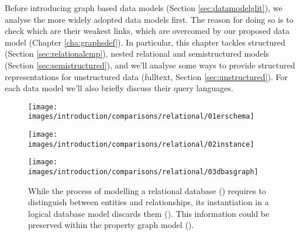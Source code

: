Before introducing graph based data models (Section \ref{sec:datamodelglit}), we  analyse the more widely adopted data models first. The reason for doing so is to check which are their weakest links, which are overcomed by our proposed data model (Chapter \vref{cha:graphsdef}). In particular, this chapter tackles structured (Section \vref{sec:relationalcmp}), nested relational and semistructured models (Section \vref{sec:semistructured}), and we'll analyse some ways to provide structured representations for unstructured data (fulltext, Section \vref{sec:unstructured}). For each data model we'll also briefly discuss their query languages.
\begin{figure}[!pth]
	\begin{minipage}[b]{\textwidth}
		\texttt{[image: images/introduction/comparisons/relational/01erschema]}
		\label{fig:erschema}
	\end{minipage}\quad

	\begin{minipage}[b]{\textwidth}
		\texttt{[image: images/introduction/comparisons/relational/02instance]}
		\label{fig:instance}
	\end{minipage}

	\begin{minipage}[b]{\textwidth}
		\centering
		\texttt{[image: images/introduction/comparisons/relational/03dbasgraph]}
		\label{fig:graphofdb1}
	\end{minipage}
	\caption{While the process of modelling a relational database () requires to distinguish between entities and relationships, its instantiation in a logical database model discards them (). This information could be preserved within the property graph model (). }
	\label{fig:relationalinstance}
\end{figure}
